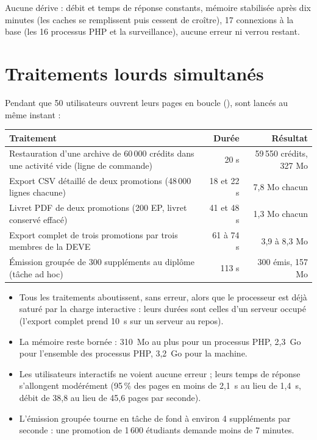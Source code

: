 \documentclass[11pt,a4paper]{article}
\newcommand{\code}[1]{\texttt{\detokenize{#1}}}
\begin{document}
Aucune dérive : débit et temps de réponse constants, mémoire stabilisée après dix minutes (les
caches se remplissent puis cessent de croître), 17 connexions à la base (les 16 processus PHP et
la surveillance), aucune erreur ni verrou restant.

\section{Traitements lourds simultanés}

Pendant que 50 utilisateurs ouvrent leurs pages en boucle (\code{lourds.py}), sont lancés au même
instant :

\begin{center}
\begin{tabularx}{\linewidth}{@{}X r r@{}}
\toprule
\textbf{Traitement} & \textbf{Durée} & \textbf{Résultat} \\
\midrule
Restauration d'une archive de 60\,000 crédits dans une activité vide (ligne de commande) & 20 s &
  59\,550 crédits, 327 Mo \\
Export CSV détaillé de deux promotions (48\,000 lignes chacune) & 18 et 22 s & 7,8 Mo chacun \\
Livret PDF de deux promotions (200 EP, livret conservé effacé) & 41 et 48 s & 1,3 Mo chacun \\
Export complet de trois promotions par trois membres de la DEVE & 61 à 74 s & 3,9 à 8,3 Mo \\
Émission groupée de 300 suppléments au diplôme (tâche ad hoc) & 113 s & 300 émis, 157 Mo \\
\bottomrule
\end{tabularx}
\end{center}

\begin{itemize}
  \item Tous les traitements aboutissent, sans erreur, alors que le processeur est déjà saturé
    par la charge interactive : leurs durées sont celles d'un serveur occupé (l'export complet
    prend 10~s sur un serveur au repos).
  \item La mémoire reste bornée : 310~Mo au plus pour un processus PHP, 2,3~Go pour l'ensemble des
    processus PHP, 3,2~Go pour la machine.
  \item Les utilisateurs interactifs ne voient aucune erreur ; leurs temps de réponse s'allongent
    modérément (95\,\% des pages en moins de 2,1~s au lieu de 1,4~s, débit de 38,8 au lieu de
    45,6 pages par seconde).
  \item L'émission groupée tourne en tâche de fond à environ 4 suppléments par seconde : une
    promotion de 1\,600 étudiants demande moins de 7 minutes.
\end{itemize}
\end{document}
